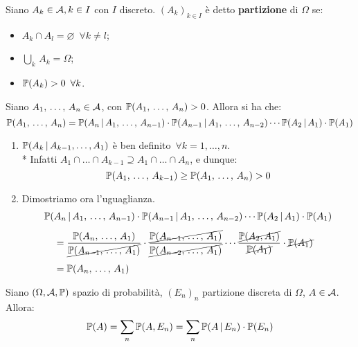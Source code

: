 \begin{defn}
  Siano $A_k \in \mathcal A, k \in I$ con $I$ discreto.
  $(A_k)_{k \in I}$ è detto \textbf{partizione} di $\Omega$ se:
  \begin{itemize}
  \item $A_k \cap A_l = \varnothing \enspace\forall k \neq l$;
  \item $\bigcup\limits_k \, A_k = \Omega$;
  \item $\mathbb P(A_k) > 0 \enspace\forall k$.
  \end{itemize}
\end{defn}

\medskip
\begin{teob}[\JPTh{3.3}]
  Siano $A_1, \, \dots, \, A_n \in \mathcal A$, con $\mathbb P(A_1, \, \dots, \, A_n) > 0$. Allora si ha che:
  $$\mathbb P(A_1, \, \dots, \, A_n) = \mathbb P(A_n \, | \, A_1, \, \dots, \, A_{n-1})
  \cdot \mathbb P(A_{n-1} \, | \, A_1, \, \dots, \, A_{n-2}) \cdots
  \mathbb P(A_2 \, | \, A_1) \cdot \mathbb P(A_1)$$
\end{teob}

\smallskip
\begin{dimo}\belowdisplayskip=-13pt
  \Fixvmode
  \begin{enumerate}
  \item $\mathbb P(A_k \, | \, A_{k-1}, \dots, A_1)$ è ben definito
    $\,\forall k = 1,\dots,n$. \\*
    Infatti $A_1 \cap \dots \cap A_{k-1} \supseteq A_1 \cap \dots \cap A_n$,
    e dunque:
    $$\mathbb P(A_1, \, \dots, \, A_{k-1}) \geq \mathbb P(A_1, \, \dots, \, A_n) > 0$$
  \item
    Dimostriamo ora l'uguaglianza.
    \begin{align*}
    \mathbb P(&A_n \, | \, A_1, \, \dots, \, A_{n-1})
    \cdot \mathbb P(A_{n-1} \, | \, A_1, \, \dots, \, A_{n-2}) \cdots
    \mathbb P(A_2 \, | \, A_1) \cdot \mathbb P(A_1) \\[4pt]
    &= \frac {\mathbb P(A_n, \, \dots, \, A_1)} {\cancel{\mathbb P(A_{n-1}, \, \dots, \, A_1)}}
    \cdot \frac {\cancel{\mathbb P(A_{n-1}, \, \dots, \, A_1)}} {\cancel{\mathbb P(A_{n-2}, \, \dots, \, A_1)}}
    \cdots
    \frac {\cancel{\mathbb P(A_2, A_1)}} {\cancel{\mathbb P(A_1)}}
    \cdot \cancel{\mathbb P(A_1)} \\[4pt]
    &= \mathbb P(A_n, \, \dots, \, A_1)
    \end{align*}\qedhere
  \end{enumerate}
\end{dimo}

\medskip
\begin{teo}
  Siano $(\Omega, \mathcal A, \mathbb P)$ spazio di probabilità,
  $(E_n)_n$ partizione discreta di $\Omega$, $A \in \mathcal A$. Allora:
  $$
  \mathbb P(A) = \sum\limits_n \mathbb P(A, E_n)
  = \sum\limits_n \mathbb P(A\,|\,E_n) \cdot \mathbb P(E_n)
  $$
\end{teo}

